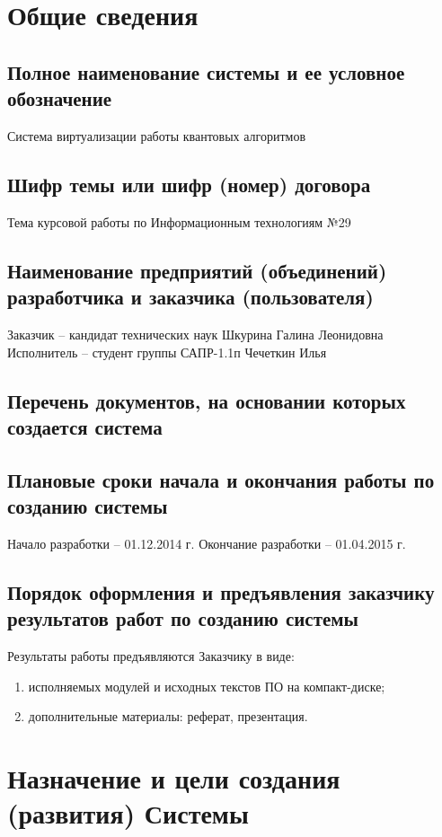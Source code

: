 \chapter{Общие сведения}
\section{Полное наименование системы и ее условное обозначение}
Система виртуализации работы квантовых алгоритмов

\section{Шифр темы или шифр (номер) договора}
Тема курсовой работы по Информационным технологиям №29

\section{Наименование предприятий (объединений) разработчика и заказчика
  (пользователя)}
Заказчик -- кандидат технических наук Шкурина Галина Леонидовна\\
Исполнитель -- студент группы САПР-1.1п Чечеткин Илья

\section{Перечень документов, на основании которых создается система}
\section{Плановые сроки начала и окончания работы по созданию системы}
Начало разработки -- 01.12.2014 г. Окончание разработки -- 01.04.2015 г.

\section{Порядок оформления и предъявления заказчику результатов работ по
  созданию системы}
Результаты работы предъявляются Заказчику в виде:
\begin{enumerate}
  \item исполняемых модулей и исходных текстов ПО на компакт-диске;
  \item дополнительные материалы: реферат, презентация.
\end{enumerate}

\chapter{Назначение и цели создания (развития) Системы}
